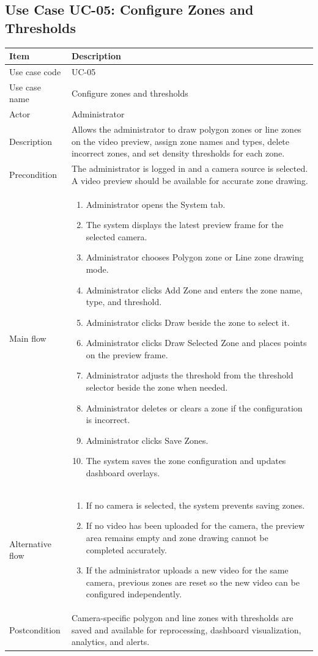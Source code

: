 \documentclass[12pt,a4paper]{report}
\begin{document}
\subsection{Use Case UC-05: Configure Zones and Thresholds}
\begin{longtable}{|p{3.6cm}|p{10.4cm}|}
\hline
\rowcolor{HeaderBlue}\textbf{Item} & \textbf{Description} \\
\hline
Use case code & UC-05 \\
\hline
Use case name & Configure zones and thresholds \\
\hline
Actor & Administrator \\
\hline
Description & Allows the administrator to draw polygon zones or line zones on the video preview, assign zone names and types, delete incorrect zones, and set density thresholds for each zone. \\
\hline
Precondition & The administrator is logged in and a camera source is selected. A video preview should be available for accurate zone drawing. \\
\hline
Main flow &
\begin{enumerate}
    \item Administrator opens the System tab.
    \item The system displays the latest preview frame for the selected camera.
    \item Administrator chooses Polygon zone or Line zone drawing mode.
    \item Administrator clicks Add Zone and enters the zone name, type, and threshold.
    \item Administrator clicks Draw beside the zone to select it.
    \item Administrator clicks Draw Selected Zone and places points on the preview frame.
    \item Administrator adjusts the threshold from the threshold selector beside the zone when needed.
    \item Administrator deletes or clears a zone if the configuration is incorrect.
    \item Administrator clicks Save Zones.
    \item The system saves the zone configuration and updates dashboard overlays.
\end{enumerate} \\
\hline
Alternative flow &
\begin{enumerate}
    \item If no camera is selected, the system prevents saving zones.
    \item If no video has been uploaded for the camera, the preview area remains empty and zone drawing cannot be completed accurately.
    \item If the administrator uploads a new video for the same camera, previous zones are reset so the new video can be configured independently.
\end{enumerate} \\
\hline
Postcondition & Camera-specific polygon and line zones with thresholds are saved and available for reprocessing, dashboard visualization, analytics, and alerts. \\
\hline
\end{longtable}
\end{document}

